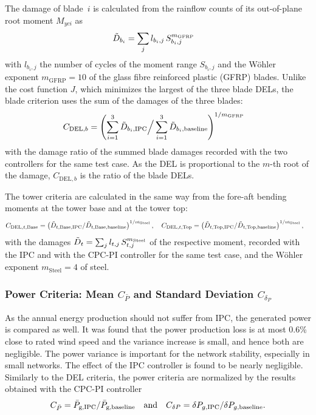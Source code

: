 The damage of blade~$i$ is calculated from the rainflow counts of its out-of-plane root moment $M_{yci}$ as
\begin{align*}
    \Tilde{D}_{b_i} &= \sum_{j} l_{b_i,j}\, S_{b_i,j}^{m_{\text{GFRP}}}
\end{align*}
with $l_{b_i,j}$ the number of cycles of the moment range $S_{b_i,j}$ and the W\"ohler exponent $m_{\text{GFRP}} = 10$ of the glass fibre reinforced plastic (GFRP) blades. Unlike the cost function $J$, which minimizes the largest of the three blade DELs, the blade criterion uses the sum of the damages of the three blades:
\begin{align*}
    C_{\text{DEL},b} &= \left(\sum_{i=1}^{3}\Tilde{D}_{b_i,\text{IPC}} \Big/ \sum_{i=1}^{3}\Tilde{D}_{b_i,\text{baseline}}\right)^{1/m_{\text{GFRP}}}
\end{align*}
with the damage ratio of the summed blade damages recorded with the two controllers for the same test case. As the DEL is proportional to the $m$-th root of the damage, $C_{\text{DEL},b}$ is the ratio of the blade DELs.

The tower criteria are calculated in the same way from the fore-aft bending moments at the tower base and at the tower top:
\begin{align*}
    C_{\text{DEL},t,\text{Base}} &= \left(\Tilde{D}_{t,\text{Base},\text{IPC}}/\Tilde{D}_{t,\text{Base},\text{baseline}}\right)^{1/m_{\text{Steel}}}, \quad
    C_{\text{DEL},t,\text{Top}} = \left(\Tilde{D}_{t,\text{Top},\text{IPC}}/\Tilde{D}_{t,\text{Top},\text{baseline}}\right)^{1/m_{\text{Steel}}},
\end{align*}
with the damages $\Tilde{D}_{t} = \sum_{j} l_{t,j}\, S_{t,j}^{m_{\text{Steel}}}$ of the respective moment, recorded with the IPC and with the CPC-PI controller for the same test case, and the W\"ohler exponent $m_{\text{Steel}} = 4$ of steel.

\subsubsection*{Power Criteria: Mean $C_{\bar{P}}$ and Standard Deviation $C_{\delta_P}$}
As the annual energy production should not suffer from IPC, the generated power is compared as well. It was found that the power production loss is at most 0.6\% close to rated wind speed and the variance increase is small, and hence both are negligible. The power variance is important for the network stability, especially in small networks. The effect of the IPC controller is found to be nearly negligible. Similarly to the DEL criteria, the power criteria are normalized by the results obtained with the CPC-PI controller
\begin{align*} %
    C_{\bar{P}} =  \bar{P}_{\text{g,\text{IPC}}}/ \bar{P}_{\text{g,\text{baseline}}}  \quad\text{and}\quad C_{\delta P} =  \delta P_{g,\text{IPC}}/ \delta P_{g,\text{baseline}}.
\end{align*} 

